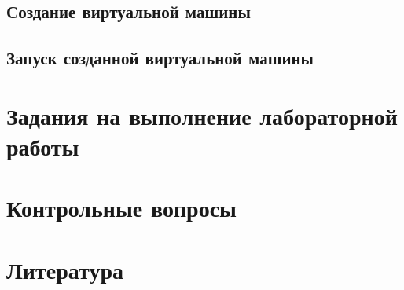 \section{Создание виртуальной машины}
\section{Запуск созданной виртуальной машины}

\chapter{Задания на выполнение лабораторной работы}
\chapter{Контрольные вопросы}

\chapter{Литература}
\begin{thebibliography}{10}
\end{thebibliography}
